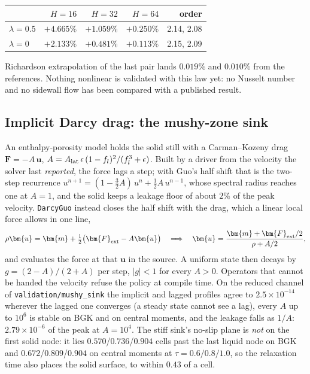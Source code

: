 \documentclass[11pt,a4paper]{article}
\newcommand{\code}[1]{\texttt{\small #1}}
\newcommand{\e}[1]{\times 10^{#1}}
\begin{document}
\begin{center}\small
\begin{tabular}{lrrrr}
\toprule
 & $H=16$ & $H=32$ & $H=64$ & order \\
\midrule
$\lambda = 0.5$ & $+4.665\%$ & $+1.059\%$ & $+0.250\%$ & 2.14, 2.08 \\
$\lambda = 0$   & $+2.133\%$ & $+0.481\%$ & $+0.113\%$ & 2.15, 2.09 \\
\bottomrule
\end{tabular}
\end{center}

Richardson extrapolation of the last pair lands $0.019\%$ and $0.010\%$ from the
references. Nothing nonlinear is validated with this law yet: no Nusselt number
and no sidewall flow has been compared with a published result.

\subsection{Implicit Darcy drag: the mushy-zone sink}
\label{sec:darcy}

An enthalpy-porosity model holds the solid still with a Carman--Kozeny drag
$\bm{F} = -A\,\bm{u}$, $A = A_{\rm lat}\,\epsilon\,(1-f_l)^2/(f_l^3+\epsilon)$.
Built by a driver from the velocity the solver last \emph{reported}, the force
lags a step; with Guo's half shift that is the two-step recurrence
$u^{n+1} = (1-\tfrac32 A)\,u^n + \tfrac12 A\,u^{n-1}$, whose spectral radius
reaches one at $A = 1$, and the solid keeps a leakage floor of about $2\%$ of
the peak velocity. \code{DarcyGuo} instead closes the half shift with the drag,
which a linear local force allows in one line,
\begin{equation}
  \rho\bm{u} = \bm{m} + \tfrac12\big(\bm{F}_{\rm ext} - A\bm{u}\big)
  \quad\Longrightarrow\quad
  \bm{u} = \frac{\bm{m} + \bm{F}_{\rm ext}/2}{\rho + A/2},
\end{equation}
and evaluates the force at that $\bm{u}$ in the source. A uniform state then
decays by $g = (2-A)/(2+A)$ per step, $|g|<1$ for every $A>0$. Operators that
cannot be handed the velocity refuse the policy at compile time. On the reduced
channel of \code{validation/mushy\_sink} the implicit and lagged profiles agree
to $2.5\e{-14}$ wherever the lagged one converges (a steady state cannot see a
lag), every $A$ up to $10^6$ is stable on BGK and on central moments, and the
leakage falls as $1/A$: $2.79\e{-6}$ of the peak at $A = 10^4$. The stiff
sink's no-slip plane is \emph{not} on the first solid node: it lies
$0.570$/$0.736$/$0.904$ cells past the last liquid node on BGK and
$0.672$/$0.809$/$0.904$ on central moments at $\tau = 0.6/0.8/1.0$, so the
relaxation time also places the solid surface, to within $0.43$ of a cell.
\end{document}
